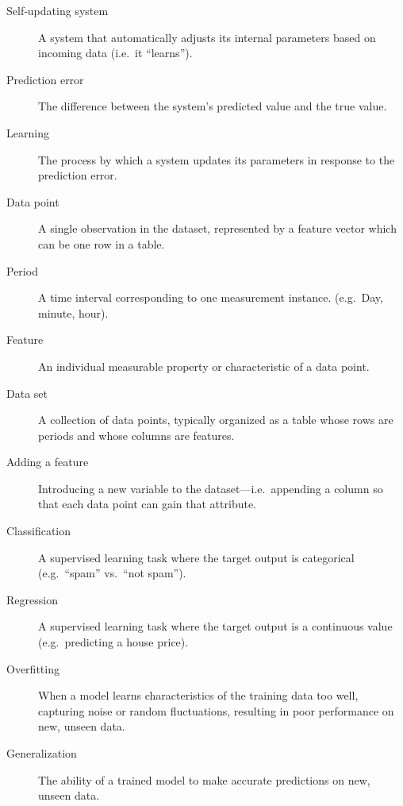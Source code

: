 \documentclass[a4paper,12pt]{report}
\begin{document}
\begin{description}
  \item[Self‑updating system] A system that automatically adjusts its internal parameters based on incoming data (i.e.\ it “learns”).

  \item[Prediction error] The difference between the system’s predicted value and the true value.

  \item[Learning] The process by which a system updates its parameters in response to the prediction error.

  \item[Data point] A single observation in the dataset, represented by a feature vector which can be one row in a table.

  \item[Period] A time interval corresponding to one measurement instance. (e.g.\ Day, minute, hour).

  \item[Feature] An individual measurable property or characteristic of a data point.

  \item[Data set] A collection of data points, typically organized as a table whose rows are periods and whose columns are features.

  \item[Adding a feature] Introducing a new variable to the dataset—i.e.\ appending a column so that each data point can gain that attribute.

  \item[Classification] A supervised learning task where the target output is categorical (e.g.\ “spam” vs.\ “not spam”).

  \item[Regression] A supervised learning task where the target output is a continuous value (e.g.\ predicting a house price).

  \item[Overfitting] When a model learns characteristics of the training data too well, capturing noise or random fluctuations, resulting in poor performance on new, unseen data.

  \item[Generalization] The ability of a trained model to make accurate predictions on new, unseen data.
\end{description}



\tableofcontents
\listoffigures
\newpage
\end{document}
